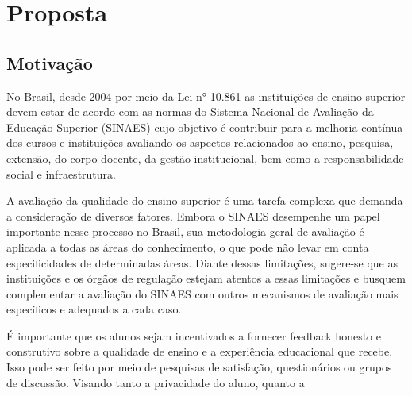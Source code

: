 \chapter{Proposta}\label{chp:PROPOSTA}


\section{Motivação}


No Brasil, desde 2004 por meio da Lei n° 10.861 as instituições de ensino superior devem estar de acordo com as normas do Sistema Nacional de Avaliação da Educação Superior (SINAES)
cujo objetivo é contribuir para a melhoria contínua dos cursos e instituições avaliando 
os aspectos relacionados ao ensino, pesquisa, extensão, do corpo docente, da gestão institucional, bem como a responsabilidade social e infraestrutura.


A avaliação da qualidade do ensino superior é uma tarefa complexa que demanda a consideração de diversos fatores.
Embora o SINAES desempenhe um papel importante nesse processo no Brasil,
sua metodologia geral de avaliação é aplicada a todas as áreas do conhecimento,
o que pode não levar em conta especificidades de determinadas áreas.
Diante dessas limitações, sugere-se que as instituições e os órgãos de regulação estejam atentos a
essas limitações e busquem complementar a avaliação do SINAES com outros mecanismos de avaliação mais específicos e adequados a cada caso. 



É importante que os alunos sejam incentivados a fornecer feedback honesto e construtivo
sobre a qualidade de ensino e a experiência educacional que recebe. Isso pode ser feito por meio de pesquisas de satisfação, questionários ou grupos de discussão.
Visando tanto a privacidade do aluno, quanto a 



